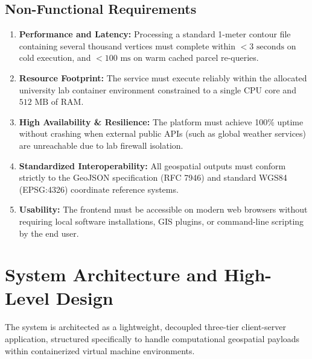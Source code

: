 \documentclass[manuscript,screen]{acmart}
\begin{document}
\subsection{Non-Functional Requirements}
\begin{enumerate}
    \item \textbf{Performance and Latency:} Processing a standard 1-meter contour file containing several thousand vertices must complete within $<3\text{ seconds}$ on cold execution, and $<100\text{ ms}$ on warm cached parcel re-queries.
    \item \textbf{Resource Footprint:} The service must execute reliably within the allocated university lab container environment constrained to a single CPU core and $512\text{ MB}$ of RAM.
    \item \textbf{High Availability \& Resilience:} The platform must achieve 100\% uptime without crashing when external public APIs (such as global weather services) are unreachable due to lab firewall isolation.
    \item \textbf{Standardized Interoperability:} All geospatial outputs must conform strictly to the GeoJSON specification (RFC 7946) and standard WGS84 (EPSG:4326) coordinate reference systems.
    \item \textbf{Usability:} The frontend must be accessible on modern web browsers without requiring local software installations, GIS plugins, or command-line scripting by the end user.
\end{enumerate}

\section{System Architecture and High-Level Design}
\label{sec:architecture}
The system is architected as a lightweight, decoupled three-tier client-server application, structured specifically to handle computational geospatial payloads within containerized virtual machine environments.
\end{document}
